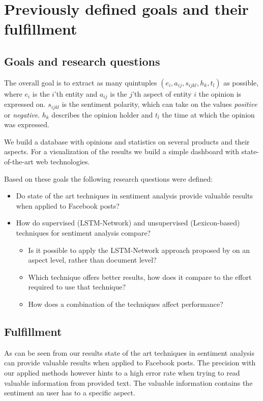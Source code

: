 \documentclass[10pt,a4paper]{article}
\begin{document}
	

	\section{Previously defined goals and their fulfillment}
	
	\subsection{Goals and research questions}
	
	The overall goal is to extract as many quintuples $(e_i, a_{ij}, s_{ijkl}, h_k, t_l)$ as possible, where $e_i$ is the $i$'th entity and $a_{ij}$ is the $j$'th aspect of entity $i$ the opinion is expressed on. $s_{ijkl}$ is the sentiment polarity, which can take on the values \textit{positive} or \textit{negative}. $h_k$ describes the opinion holder and $t_l$ the time at which the opinion was expressed.
	
	We build a database with opinions and statistics on several products and their aspects. For a visualization of the results we build a simple dashboard with state-of-the-art web technologies.

	Based on these goals the following research questions were defined:

	\begin{itemize}
	\item Do state of the art techniques in sentiment analysis provide valuable results when applied to Facebook posts?
	\item How do supervised (LSTM-Network) and unsupervised (Lexicon-based) techniques for sentiment analysis compare?
		\begin{itemize}
		\item Is it possible to apply the LSTM-Network approach proposed by \cite{hongsentiment} on an aspect level, rather than document level?
		\item Which technique offers better results, how does it compare to the effort required to use that technique?
		\item How does a combination of the techniques affect performance?
		\end{itemize}
	\end{itemize}
	
	\subsection{Fulfillment}
	
	As can be seen from our results state of the art techniques in sentiment analysis can provide valuable results when applied to Facebook posts. The precision with our applied methods however hints to a high error rate when trying to read valuable information from provided text. The valuable information contains the sentiment an user has to a specific aspect.
	
\end{document}
